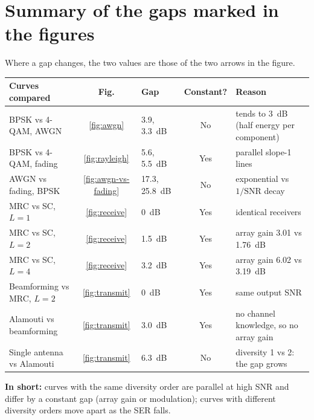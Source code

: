 \documentclass[11pt,a4paper]{article}
\newcommand{\snr}{\mathrm{SNR}}
\begin{document}
\section{Summary of the gaps marked in the figures}

Where a gap changes, the two values are those of the two arrows in the figure.

\begin{center}\small
  \setlength{\tabcolsep}{4pt}
  \begin{tabular}{@{}lclcl@{}}
    \toprule
    Curves compared & Fig. & Gap & Constant? & Reason \\
    \midrule
    BPSK vs 4-QAM, AWGN      & \ref{fig:awgn}            & 3.9, 3.3~dB   & No  & tends to 3~dB (half energy per component) \\
    BPSK vs 4-QAM, fading    & \ref{fig:rayleigh}        & 5.6, 5.5~dB   & Yes & parallel slope-1 lines \\
    AWGN vs fading, BPSK     & \ref{fig:awgn-vs-fading}  & 17.3, 25.8~dB & No  & exponential vs $1/\snr$ decay \\
    MRC vs SC, $L = 1$       & \ref{fig:receive}         & 0~dB          & Yes & identical receivers \\
    MRC vs SC, $L = 2$       & \ref{fig:receive}         & 1.5~dB        & Yes & array gain 3.01 vs 1.76~dB \\
    MRC vs SC, $L = 4$       & \ref{fig:receive}         & 3.2~dB        & Yes & array gain 6.02 vs 3.19~dB \\
    Beamforming vs MRC, $L = 2$ & \ref{fig:transmit}    & 0~dB          & Yes & same output SNR \\
    Alamouti vs beamforming  & \ref{fig:transmit}        & 3.0~dB        & Yes & no channel knowledge, so no array gain \\
    Single antenna vs Alamouti & \ref{fig:transmit}      & 6.3~dB        & No  & diversity 1 vs 2: the gap grows \\
    \bottomrule
  \end{tabular}
\end{center}

\textbf{In short:} curves with the same diversity order are parallel at high SNR and
differ by a constant gap (array gain or modulation); curves with different diversity
orders move apart as the SER falls.

\appendix
\end{document}
